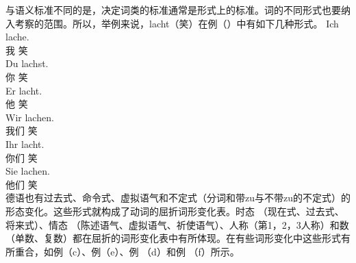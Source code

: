 与语义标准不同的是，决定词类的标准通常是形式上的标准。词的不同形式也要纳入考察的范围。所以，举例来说，lacht（笑）在例（）中有如下几种形式。
\eal
\ex 
\gll Ich lache.\\
     我 笑\\
\ex 
\gll Du lachst.\\
     你 笑\\
\ex 
\gll Er lacht.\\
     他 笑\\
\ex 
\gll Wir lachen.\\
     我们 笑\\
\ex 
\gll Ihr lacht.\\
     你们 笑\\
\ex 
\gll Sie lachen.\\
     他们 笑\\
\zl
德语也有过去式、命令式、虚拟语气和不定式（分词和带zu与不带zu的不定式）的形态变化。这些形式就构成了动词的屈折词形变化表。时态 （现在式、过去式、将来式）、情态 （陈述语气、虚拟语气、祈使语气）、人称（第1，2，3人称）和数（单数、复数）都在屈折的词形变化表中有所体现。在有些词形变化中这些形式有所重合，如例（c）、例（e）、例 （d）和例 （f）所示。

